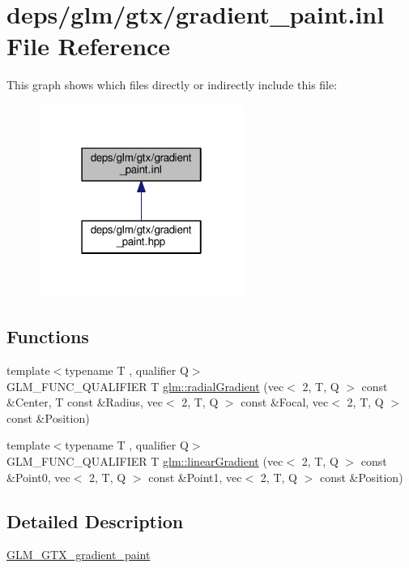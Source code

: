 \hypertarget{gradient__paint_8inl}{}\section{deps/glm/gtx/gradient\+\_\+paint.inl File Reference}
\label{gradient__paint_8inl}
This graph shows which files directly or indirectly include this file\+:
\nopagebreak
\begin{figure}[H]
\begin{center}
\leavevmode
\includegraphics[width=190pt]{dc/d7d/gradient__paint_8inl__dep__incl}
\end{center}
\end{figure}
\subsection*{Functions}
\begin{DoxyCompactItemize}
\item 
{\footnotesize template$<$typename T , qualifier Q$>$ }\\G\+L\+M\+\_\+\+F\+U\+N\+C\+\_\+\+Q\+U\+A\+L\+I\+F\+I\+ER T \hyperlink{group__gtx__gradient__paint_gaaecb1e93de4cbe0758b882812d4da294}{glm\+::radial\+Gradient} (vec$<$ 2, T, Q $>$ const \&Center, T const \&Radius, vec$<$ 2, T, Q $>$ const \&Focal, vec$<$ 2, T, Q $>$ const \&Position)
\item 
{\footnotesize template$<$typename T , qualifier Q$>$ }\\G\+L\+M\+\_\+\+F\+U\+N\+C\+\_\+\+Q\+U\+A\+L\+I\+F\+I\+ER T \hyperlink{group__gtx__gradient__paint_ga849241df1e55129b8ce9476200307419}{glm\+::linear\+Gradient} (vec$<$ 2, T, Q $>$ const \&Point0, vec$<$ 2, T, Q $>$ const \&Point1, vec$<$ 2, T, Q $>$ const \&Position)
\end{DoxyCompactItemize}


\subsection{Detailed Description}
\hyperlink{group__gtx__gradient__paint}{G\+L\+M\+\_\+\+G\+T\+X\+\_\+gradient\+\_\+paint} 